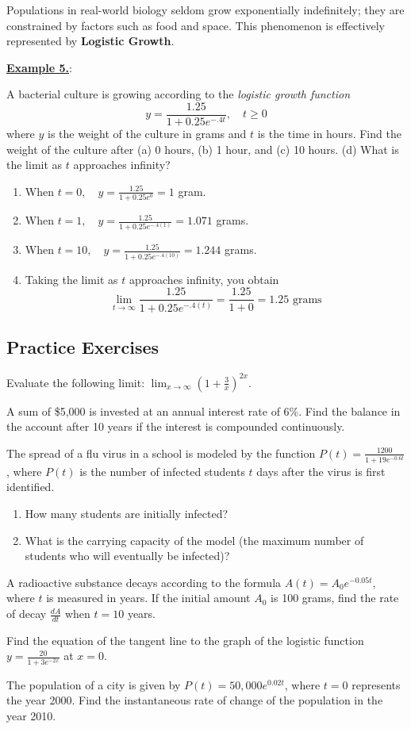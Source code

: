 \documentclass[12pt, letterpaper]{article}
\newcommand{\mychapter}{5}
\newcounter{examplecount}
\renewcommand{\theexamplecount}{\mychapter.\arabic{examplecount}}
\newenvironment{example}{
    \refstepcounter{examplecount}
    \begin{examplewrapper}
    \noindent\underline{\textbf{Example \theexamplecount}}: 
}{
    \end{examplewrapper}
}
\newenvironment{exercises}[1][]{
    \begin{tcolorbox}[
        colback=white,
        colframe=black,
        arc=3mm,
        boxrule=1pt,
        breakable,
        enhanced,
        parbox=false
    ]

    \subsection*{Practice Exercises}

    \if\relax\detokenize{#1}\relax\else
        \noindent #1\par\medskip
    \fi

    \begin{exlist}[resume=practice_series]
}{
    \end{exlist}

    \vspace{1in}

    \end{tcolorbox}
}
\begin{document}
Populations in real-world biology seldom grow exponentially indefinitely; they are constrained by factors such as food and space. This phenomenon is effectively represented by \textbf{Logistic Growth}.


\begin{example}
    A bacterial culture is growing according to the \textit{logistic growth function}
    $$y =\frac{1.25}{1+0.25e^{-.4t}}, \quad t\geq 0$$
    where $y$ is the weight of the culture in grams and $t$ is the time in hours. Find the weight of the culture after (a) 0 hours, (b) 1 hour, and (c) 10 hours. (d) What is the limit as $t$ approaches infinity?

    \begin{enumerate}[label=(\alph*)]
        \item When $\displaystyle t=0, \quad y =\frac{1.25}{1+0.25e^{0}} = 1$ gram.
        \item When $\displaystyle t=1, \quad y =\frac{1.25}{1+0.25e^{-.4(1)}} = 1.071$ grams.
        \item When $\displaystyle t=10, \quad y =\frac{1.25}{1+0.25e^{-.4(10)}} = 1.244$ grams.
        \item Taking the limit as $t$ approaches infinity, you obtain
        $$ \displaystyle  \lim_{t\to\infty}\frac{1.25}{1+0.25e^{-.4(t)}} = \frac{1.25}{1+0} = 1.25 \text{ grams} $$
    \end{enumerate}
\end{example}

\begin{exercises}
    \item Evaluate the following limit: $\displaystyle \lim_{x \to \infty} \left( 1 + \frac{3}{x} \right)^{2x}$.
    \item A sum of \$5,000 is invested at an annual interest rate of 6\%. Find the balance in the account after 10 years if the interest is compounded continuously.
    \item The spread of a flu virus in a school is modeled by the function $P(t) = \frac{1200}{1 + 19e^{-0.6t}}$, where $P(t)$ is the number of infected students $t$ days after the virus is first identified.
    \begin{enumerate}
        \item How many students are initially infected?
        \item What is the carrying capacity of the model (the maximum number of students who will eventually be infected)?
    \end{enumerate}
    \item A radioactive substance decays according to the formula $A(t) = A_0 e^{-0.05t}$, where $t$ is measured in years. If the initial amount $A_0$ is 100 grams, find the rate of decay $\frac{dA}{dt}$ when $t=10$ years.
    \item Find the equation of the tangent line to the graph of the logistic function $y = \frac{20}{1 + 3e^{-2x}}$ at $x=0$.
    \item The population of a city is given by $P(t) = 50,000e^{0.02t}$, where $t=0$ represents the year 2000. Find the instantaneous rate of change of the population in the year 2010.
\end{exercises}
\end{document}
